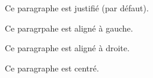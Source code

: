 \documentclass{article}
\begin{document}
Ce paragraphe est justifié (par défaut).

\begin{flushleft}
  Ce paragrpahe est aligné à gauche.
\end{flushleft}

\begin{flushright}
  Ce paragraphe est aligné à droite.
\end{flushright}

\begin{center}
  Ce paragraphe est centré.
\end{center}
\end{document}
